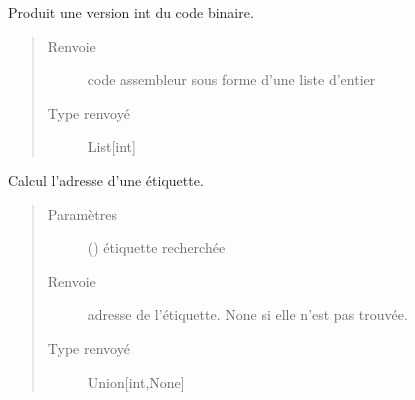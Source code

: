 \documentclass[letterpaper,10pt,french]{sphinxmanual}
\begin{document}
\begin{fulllineitems}

\begin{fulllineitems}
\label{\detokenize{assembleurcontainer:assembleurcontainer.AssembleurContainer.getDecimal}}
Produit une version int du code binaire.
\begin{quote}\begin{description}
\item[{Renvoie}] \leavevmode
code assembleur sous forme d’une liste d’entier

\item[{Type renvoyé}] \leavevmode
List{[}int{]}

\end{description}\end{quote}

\end{fulllineitems}


\begin{fulllineitems}
\label{\detokenize{assembleurcontainer:assembleurcontainer.AssembleurContainer.getLineLabel}}
Calcul l’adresse d’une étiquette.
\begin{quote}\begin{description}
\item[{Paramètres}] \leavevmode
{} ({\hyperref[\detokenize{label:label.Label}]{}}) \textendash{} étiquette recherchée

\item[{Renvoie}] \leavevmode
adresse de l’étiquette. None si elle n’est pas trouvée.

\item[{Type renvoyé}] \leavevmode
Union{[}int,None{]}

\end{description}\end{quote}

\end{fulllineitems}


\end{fulllineitems}
\end{document}
